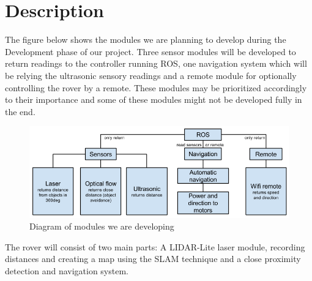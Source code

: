 \section{Description}

The figure below shows the modules we are planning to develop during the Development phase of our project. Three sensor modules will be developed to return readings to the controller running ROS, one navigation system which will be relying the ultrasonic sensory readings and a remote module for optionally controlling the rover by a remote. These modules may be prioritized accordingly to their importance and some of these modules might not be developed fully in the end.

\begin{figure}[H]
	\centering
	\includegraphics[scale=.5]{images/developmentdiagram.png}
	\caption{Diagram of modules we are developing}
	\label{fig:developmentdiagram}
\end{figure}

The rover will consist of two main parts: A LIDAR-Lite laser module, recording distances and creating a map using the SLAM technique and a close proximity detection and navigation system.